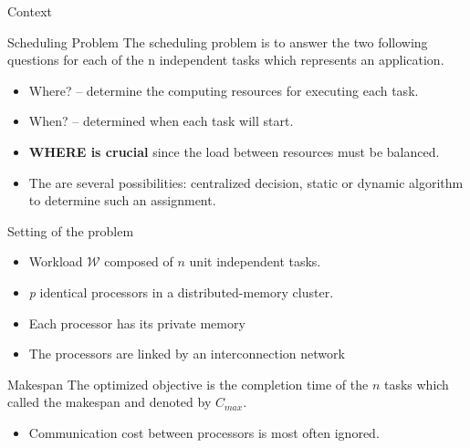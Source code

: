 \documentclass{beamer}
\begin{document}
\begin{frame}{Context}
    \begin{block}{Scheduling Problem}
        The scheduling problem is to answer the two following questions
        for each of the n independent tasks which represents an application.
        \begin{itemize}
            \item \alert{Where?} – determine the computing resources for executing each task.
            \item \alert{When?} – determined when each task will start. 

        \end{itemize}
    \end{block}
\bigskip

    \begin{itemize}
        \item \textbf{WHERE is crucial} since the load between resources must be balanced. 
        \item The are several possibilities: centralized decision, static or dynamic algorithm to determine such an assignment.

    \end{itemize}
\end{frame}




\begin{frame}{Setting of the problem}
    \begin{itemize}
        \item { Workload $\mathcal{W}$ composed of $n$ unit independent tasks.}
        \item { \emph{p} identical processors in a distributed-memory cluster.  }                                     
        \item { Each processor has its private memory}
        \item { The processors are linked by an interconnection network}                                     
    \end{itemize}
        
        \begin{block}{Makespan}
            The optimized objective is the completion time of the $n$ tasks which called the \alert{makespan} and denoted by \alert{$C_{max}$}.
        \end{block}
        
     \begin{itemize}
         \item \alert{ Communication cost between processors is most often ignored. }                                     
     \end{itemize}

\end{frame}
\end{document}
